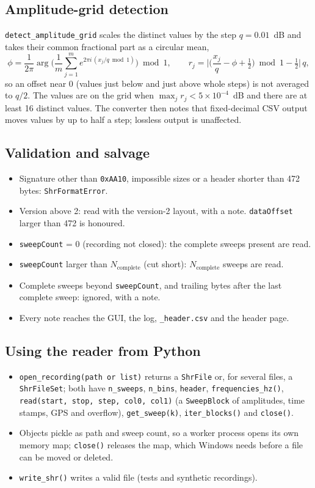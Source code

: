 \documentclass[11pt,a4paper]{article}
\newcommand{\code}[1]{\texttt{#1}}
\begin{document}
\subsection{Amplitude-grid detection}
\code{detect\_amplitude\_grid} scales the distinct values by the step $q=0.01$~dB and takes their common
fractional part as a circular mean,
\begin{equation}
\phi=\frac{1}{2\pi}\arg\Big(\frac1m\sum_{j=1}^{m}e^{2\pi i\,(x_j/q\bmod 1)}\Big)\bmod 1,
\qquad r_j=\Big|\Big(\frac{x_j}{q}-\phi+\tfrac12\Big)\bmod 1-\tfrac12\Big|\,q ,
\end{equation}
so an offset near 0 (values just below and just above whole steps) is not averaged to $q/2$. The values are on
the grid when $\max_j r_j<5\times10^{-4}$~dB and there are at least 16 distinct values. The converter then
notes that fixed-decimal CSV output moves values by up to half a step; lossless output is unaffected.

\subsection{Validation and salvage}
\begin{itemize}[nosep]
\item Signature other than \code{0xAA10}, impossible sizes or a header shorter than 472 bytes: \code{ShrFormatError}.
\item Version above 2: read with the version-2 layout, with a note.
      \code{dataOffset} larger than 472 is honoured.
\item \code{sweepCount} = 0 (recording not closed): the complete sweeps present are read.
\item \code{sweepCount} larger than $N_\mathrm{complete}$ (cut short): $N_\mathrm{complete}$ sweeps are read.
\item Complete sweeps beyond \code{sweepCount}, and trailing bytes after the last complete sweep: ignored,
      with a note.
\item Every note reaches the GUI, the log, \code{\_header.csv} and the header page.
\end{itemize}

\subsection{Using the reader from Python}
\begin{itemize}[nosep]
\item \code{open\_recording(path or list)} returns a \code{ShrFile} or, for several files, a
      \code{ShrFileSet}; both have \code{n\_sweeps}, \code{n\_bins}, \code{header},
      \code{frequencies\_hz()}, \code{read(start, stop, step, col0, col1)} (a \code{SweepBlock} of
      amplitudes, time stamps, GPS and overflow), \code{get\_sweep(k)}, \code{iter\_blocks()} and
      \code{close()}.
\item Objects pickle as path and sweep count, so a worker process opens its own memory map; \code{close()}
      releases the map, which Windows needs before a file can be moved or deleted.
\item \code{write\_shr()} writes a valid file (tests and synthetic recordings).
\end{itemize}
\end{document}

